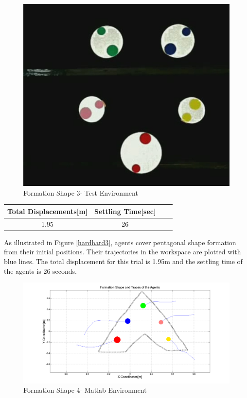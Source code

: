 \begin{figure}[H]
\caption{Formation Shape 3- Test Environment}
\centerline{\includegraphics[scale = 0.35]{5_real_hardware}}
\end{figure} 
					
\begin{center}
 \label{hardwareshape3_ref} 
\begin{tabular}{||c| c |c |c ||}
\hline
Total Displacements[m]  & Settling Time[sec]\\ 
\hline
1.95 & 26 \\
\hline
\end{tabular}
\end{center}
	
As illustrated in Figure \ref{hardhard3}, agents cover pentagonal shape formation from their initial positions. Their trajectories in the workspace are plotted with blue lines. The total displacement for this trial is 1.95m and the settling time of the agents is 26 seconds.	
		
\begin{figure}[H]
\caption{Formation Shape 4- Matlab Environment} \label{hardhard4}
\centerline{\includegraphics[scale = 0.32]{6_hardware}}
\end{figure} 
					
